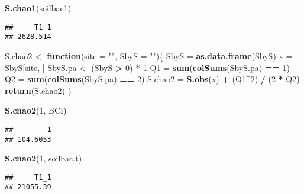 \documentclass[
]{article}
\newenvironment{Shaded}{\begin{snugshade}}{\end{snugshade}}
\newcommand{\AttributeTok}[1]{\textcolor[rgb]{0.13,0.29,0.53}{#1}}
\newcommand{\ControlFlowTok}[1]{\textcolor[rgb]{0.13,0.29,0.53}{\textbf{#1}}}
\newcommand{\DecValTok}[1]{\textcolor[rgb]{0.00,0.00,0.81}{#1}}
\newcommand{\FunctionTok}[1]{\textcolor[rgb]{0.13,0.29,0.53}{\textbf{#1}}}
\newcommand{\NormalTok}[1]{#1}
\newcommand{\OtherTok}[1]{\textcolor[rgb]{0.56,0.35,0.01}{#1}}
\newcommand{\SpecialCharTok}[1]{\textcolor[rgb]{0.81,0.36,0.00}{\textbf{#1}}}
\newcommand{\StringTok}[1]{\textcolor[rgb]{0.31,0.60,0.02}{#1}}
\begin{document}
\begin{Shaded}
\begin{Highlighting}[]
\FunctionTok{S.chao1}\NormalTok{(soilbac1)}
\end{Highlighting}
\end{Shaded}

\begin{verbatim}
##     T1_1 
## 2628.514
\end{verbatim}

\begin{Shaded}
\begin{Highlighting}[]
\NormalTok{S.chao2 }\OtherTok{\textless{}{-}} \ControlFlowTok{function}\NormalTok{(}\AttributeTok{site =} \StringTok{""}\NormalTok{, }\AttributeTok{SbyS =} \StringTok{""}\NormalTok{)\{}
\NormalTok{  SbyS }\OtherTok{=} \FunctionTok{as.data.frame}\NormalTok{(SbyS)}
\NormalTok{  x }\OtherTok{=}\NormalTok{ SbyS[site, ]}
\NormalTok{  SbyS.pa }\OtherTok{\textless{}{-}}\NormalTok{ (SbyS }\SpecialCharTok{\textgreater{}} \DecValTok{0}\NormalTok{) }\SpecialCharTok{*} \DecValTok{1}
\NormalTok{  Q1 }\OtherTok{=} \FunctionTok{sum}\NormalTok{(}\FunctionTok{colSums}\NormalTok{(SbyS.pa) }\SpecialCharTok{==} \DecValTok{1}\NormalTok{)}
\NormalTok{  Q2 }\OtherTok{=} \FunctionTok{sum}\NormalTok{(}\FunctionTok{colSums}\NormalTok{(SbyS.pa) }\SpecialCharTok{==} \DecValTok{2}\NormalTok{)}
\NormalTok{  S.chao2 }\OtherTok{=} \FunctionTok{S.obs}\NormalTok{(x) }\SpecialCharTok{+}\NormalTok{ (Q1}\SpecialCharTok{\^{}}\DecValTok{2}\NormalTok{) }\SpecialCharTok{/}\NormalTok{ (}\DecValTok{2} \SpecialCharTok{*}\NormalTok{ Q2)}
  \FunctionTok{return}\NormalTok{(S.chao2)}
\NormalTok{\}}

\FunctionTok{S.chao2}\NormalTok{(}\DecValTok{1}\NormalTok{, BCI)}
\end{Highlighting}
\end{Shaded}

\begin{verbatim}
##        1 
## 104.6053
\end{verbatim}

\begin{Shaded}
\begin{Highlighting}[]
\FunctionTok{S.chao2}\NormalTok{(}\DecValTok{1}\NormalTok{, soilbac.t)}
\end{Highlighting}
\end{Shaded}

\begin{verbatim}
##     T1_1 
## 21055.39
\end{verbatim}
\end{document}
